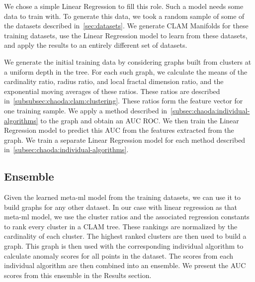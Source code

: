 We chose a simple Linear Regression to fill this role.
Such a model needs some data to train with.
To generate this data, we took a random sample of some of the datasets described in~\ref{sec:datasets}.
We generate CLAM Manifolds for these training datasets, use the Linear Regression model to learn from these datasets, and apply the results to an entirely different set of datasets.

We generate the initial training data by considering graphs built from clusters at a uniform depth in the tree.
For each such graph, we calculate the means of the cardinality ratio, radius ratio, and local fractal dimension ratio, and the exponential moving averages of these ratios.
These ratios are described in~\ref{subsubsec:chaoda:clam:clustering}.
These ratios form the feature vector for one training sample.
We apply a method described in~\ref{subsec:chaoda:individual-algorithms} to the graph and obtain an AUC ROC\@.
We then train the Linear Regression model to predict this AUC from the features extracted from the graph.
We train a separate Linear Regression model for each method described in~\ref{subsec:chaoda:individual-algorithms}.


\subsection{Ensemble}
\label{subsec:chaoda:ensemble}
Given the learned meta-ml model from the training datasets, we can use it to build graphs for any other dataset.
In our case with linear regression as that meta-ml model, we use the cluster ratios and the associated regression constants to rank every cluster in a CLAM tree.
These rankings are normalized by the cardinality of each cluster.
The highest ranked clusters are then used to build a graph.
This graph is then used with the corresponding individual algorithm to calculate anomaly scores for all points in the dataset.
The scores from each individual algorithm are then combined into an ensemble.
We present the AUC scores from this ensemble in the Results section.
